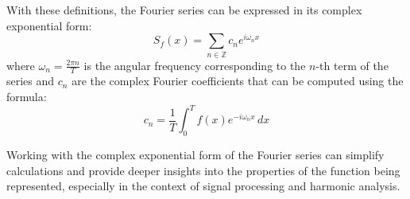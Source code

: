 With these definitions, the Fourier series can be expressed in its complex exponential form:
\[
    S_f(x) = \sum\limits_{n\in \mathbb{Z}} c_n e^{i\omega_n x}
\]
where $\omega_n = \frac{2\pi n}{T}$ is the angular frequency corresponding to the $n$-th term of the series and $c_n$ are the complex Fourier coefficients that can be computed using the formula:
\[
    c_n = \frac{1}{T} \int_0^T f(x) e^{-i\omega_n x} \, dx
\]

Working with the complex exponential form of the Fourier series can simplify calculations and provide deeper insights into the properties of the function being represented, especially in the context of signal processing and harmonic analysis.